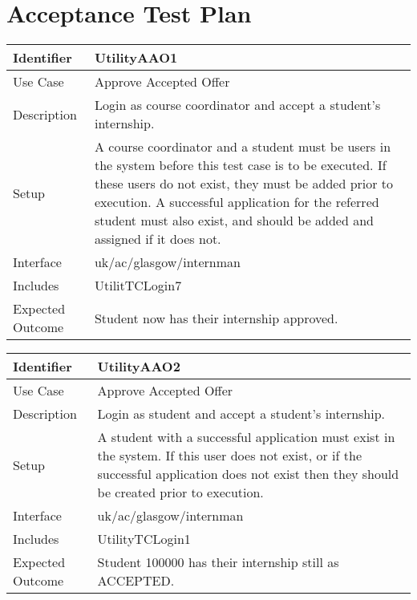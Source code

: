\section{Acceptance Test Plan}

\begin{tabularx}{\textwidth}{|T|L|}
\hline
Identifier & UtilityAAO1\\
\hline
Use Case & Approve Accepted Offer \\
\hline
Description & Login as course coordinator and accept a student's internship.\\
\hline
Setup & A course coordinator and a student must be users in the system
before this test case is to be executed. If these users do not exist,
they must be added prior to execution. A successful application for
the referred student must also exist, and should be added and assigned
if it does not.\\
\hline
Interface & uk/ac/glasgow/internman \\
\hline
Includes & UtilitTCLogin7 \\
\hline
Expected Outcome & Student now has their internship approved.\\
\hline
\end{tabularx}

\vspace{2em}

\begin{tabularx}{\textwidth}{|T|L|}
\hline
Identifier & UtilityAAO2\\
\hline
Use Case & Approve Accepted Offer \\
\hline
Description & Login as student and accept a student's internship.\\
\hline
Setup & A student with a successful application must exist in the
system. If this user does not exist, or if the successful application
does not exist then they should be created prior to execution. \\
\hline
Interface & uk/ac/glasgow/internman \\
\hline
Includes & UtilityTCLogin1 \\
\hline
Expected Outcome & Student 100000 has their internship still as ACCEPTED.\\
\hline
\end{tabularx}

\vspace{2em}

